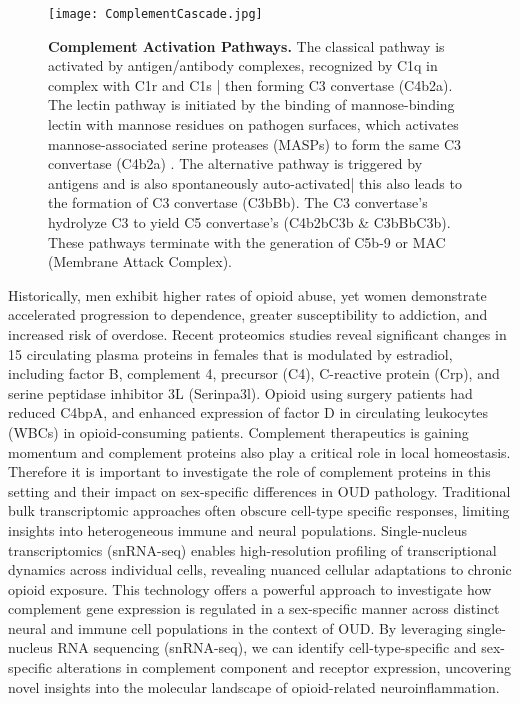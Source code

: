 \documentclass[10pt,letterpaper]{article}
\begin{document}
\begin{figure}[ht] %
\texttt{[image: ComplementCascade.jpg]}
\caption{\color{Gray} \textbf{Complement Activation Pathways. }
The classical pathway is activated by antigen/antibody complexes, recognized by C1q in complex with C1r and C1s \cite{Girardi2020}| then forming C3 convertase (C4b2a). The lectin pathway is initiated by the binding of mannose-binding lectin with mannose residues on pathogen surfaces, which activates mannose-associated serine proteases (MASPs) to form the same C3 convertase (C4b2a) \cite{jcm10102188}. The alternative pathway is triggered by antigens and is also spontaneously auto-activated| this also leads to the formation of C3 convertase (C3bBb). The C3 convertase's hydrolyze C3 to yield C5 convertase's (C4b2bC3b \& C3bBbC3b). These pathways terminate with the generation of C5b-9 or MAC (Membrane Attack Complex).
}
\label{ComplementCascade} %
\end{figure}

Historically, men exhibit higher rates of opioid abuse, yet women demonstrate accelerated progression to dependence, greater susceptibility to addiction, and increased risk of overdose. Recent proteomics studies reveal significant changes in 15 circulating plasma proteins in females that is modulated by estradiol, including factor B, complement 4, precursor (C4), C-reactive protein (Crp), and serine peptidase inhibitor 3L (Serinpa3l). Opioid using surgery patients had reduced C4bpA, and enhanced expression of factor D in circulating leukocytes (WBCs) in opioid-consuming patients. Complement therapeutics is gaining momentum and complement proteins also play a critical role in local homeostasis. Therefore it is important to investigate the role of complement proteins in this setting and their impact on sex-specific differences in OUD pathology. Traditional bulk transcriptomic approaches often obscure cell-type specific responses, limiting insights into heterogeneous immune and neural populations. Single-nucleus transcriptomics (snRNA-seq) enables high-resolution profiling of transcriptional dynamics across individual cells, revealing nuanced cellular adaptations to chronic opioid exposure. This technology offers a powerful approach to investigate how complement gene expression is regulated in a sex-specific manner across distinct neural and immune cell populations in the context of OUD. By leveraging single-nucleus RNA sequencing (snRNA-seq), we can identify cell-type-specific and sex-specific alterations in complement component and receptor expression, uncovering novel insights into the molecular landscape of opioid-related neuroinflammation.
\end{document}
